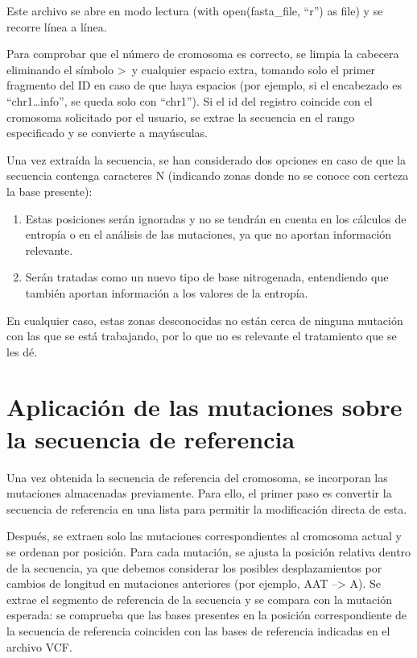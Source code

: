 \documentclass[11pt,spanish,listoffigures,listoftables]{tfgetsinf}
\begin{document}
Este archivo se abre en modo lectura (with open(fasta\_file, ``r'') as file) y se recorre línea a línea.

Para comprobar que el número de cromosoma es correcto, se limpia la cabecera eliminando el símbolo >\ y cualquier espacio extra, tomando solo el primer fragmento del ID en caso de que haya espacios (por ejemplo, si el encabezado es ``chr1\dots info'', se queda solo con ``chr1''). Si el id del registro coincide con el cromosoma solicitado por el usuario, se extrae la secuencia en el rango especificado y se convierte a mayúsculas. 

Una vez extraída la secuencia, se han considerado dos opciones en caso de que la secuencia contenga caracteres N (indicando zonas donde no se conoce con certeza la base presente): 

\begin{enumerate}
  \item Estas posiciones serán ignoradas y no se tendrán en cuenta en los cálculos de entropía o en el análisis de las mutaciones, ya que no aportan información relevante.
  \item Serán tratadas como un nuevo tipo de base nitrogenada, entendiendo que también aportan información a los valores de la entropía.
\end{enumerate}

En cualquier caso, estas zonas desconocidas no están cerca de ninguna mutación con las que se está trabajando, por lo que no es relevante el tratamiento que se les dé. 

\section{Aplicación de las mutaciones sobre la secuencia de referencia}

Una vez obtenida la secuencia de referencia del cromosoma, se incorporan las mutaciones almacenadas previamente. Para ello, el primer paso es convertir la secuencia de referencia en una lista para permitir la modificación directa de esta. 

Después, se extraen solo las mutaciones correspondientes al cromosoma actual y se ordenan por posición. Para cada mutación, se ajusta la posición relativa dentro de la secuencia, ya que debemos considerar los posibles desplazamientos por cambios de longitud en mutaciones anteriores (por ejemplo, AAT --> A). Se extrae el segmento de referencia de la secuencia y se compara con la mutación esperada: se comprueba que las bases presentes en la posición correspondiente de la secuencia de referencia coinciden con las bases de referencia indicadas en el archivo \acs{VCF}. 
\end{document}
